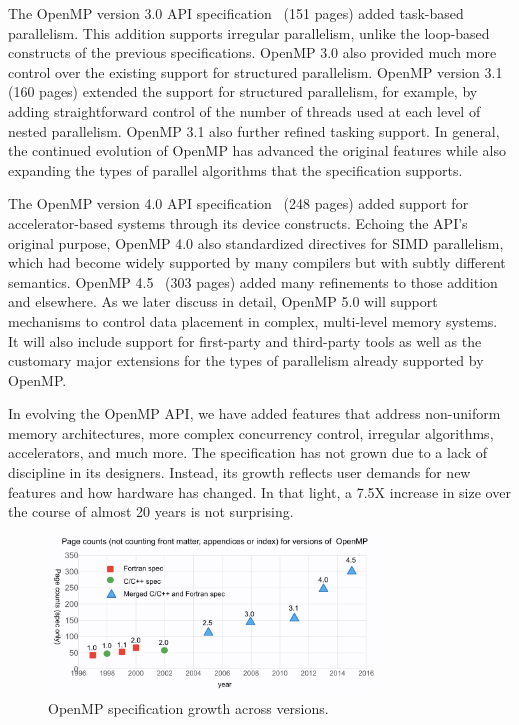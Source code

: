 The OpenMP version 3.0 API specification~\cite{openmp3} (151 pages) added
task-based parallelism. This addition supports irregular parallelism, unlike the
loop-based constructs of the previous specifications. OpenMP 3.0 also provided
much more control over the existing support for structured parallelism. OpenMP
version 3.1~\cite{openmp31} (160 pages) extended the support for structured parallelism, for
example, by adding straightforward control of the number of threads used at each
level of nested parallelism. OpenMP 3.1 also further refined tasking support. In
general, the continued evolution of OpenMP has advanced the original features
while also expanding the types of parallel algorithms that the specification
supports.

The OpenMP version 4.0 API specification~\cite{openmp4} (248 pages) added support for 
accelerator-based systems through its device constructs. Echoing the API's 
original purpose, OpenMP 4.0 also standardized directives for SIMD 
parallelism, which had become widely supported by many compilers but 
with subtly different semantics. OpenMP 4.5~\cite{openmp45} (303 pages) added many 
refinements to those addition and elsewhere. As we later discuss in 
detail, OpenMP 5.0 will support mechanisms to control data placement in
complex, multi-level memory systems. It will also include support for
first-party and third-party tools as well as the customary major 
extensions for the types of parallelism already supported by OpenMP.

In evolving the OpenMP API, we have added features that address 
non-uniform memory architectures, more complex concurrency control, 
irregular algorithms, accelerators, and much more. The specification 
has not grown due to a lack of discipline in its designers. Instead,
its growth reflects user demands for new features and how hardware 
has changed. In that light, a 7.5X increase in size over the course 
of almost 20 years is not surprising.

\begin{figure}
  \centering
  \includegraphics[width=3.4in]{pics/opcounts.png}
  \caption{OpenMP specification growth across versions.\label{omppcount}}
\end{figure}


